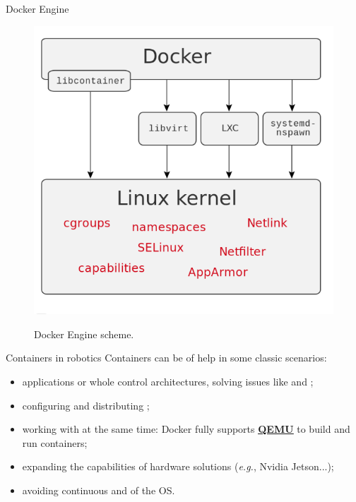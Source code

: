 \begin{frame}{Docker Engine}
	\begin{figure}
		\centering
		\includegraphics[scale=.29]{dockerScheme.png}
		\label{fig:dockerscheme}
		\caption{Docker Engine scheme.}
	\end{figure}
\end{frame}

\begin{frame}{Containers in robotics}
	Containers can be of help in some classic scenarios:
	\begin{itemize}
		\item {} applications or whole control architectures, solving issues like  and ;
		\item configuring and distributing ;
		\item working with  at the same time: Docker fully supports \href{https://www.qemu.org/}{\color{blue}\textbf{\underline{QEMU}}} to build and run containers;
		\item expanding the capabilities of  hardware solutions (\emph{e.g.}, Nvidia Jetson...);
		\item avoiding continuous  and  of the OS.
	\end{itemize}
\end{frame}

